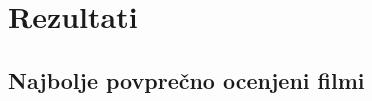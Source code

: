 \documentclass[a4paper,11pt]{article}
\begin{document}
\section{Rezultati}


%
%

\subsection{Najbolje povprečno ocenjeni filmi}
\end{document}
